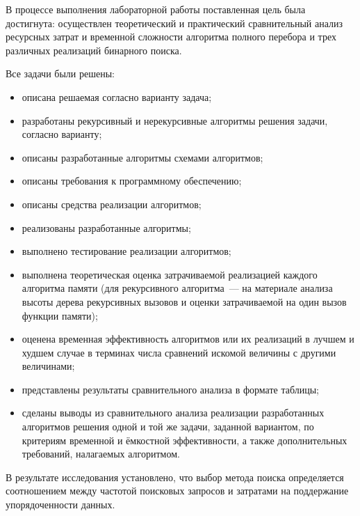 
В процессе выполнения лабораторной работы поставленная цель была достигнута: осуществлен теоретический и практический сравнительный анализ ресурсных затрат и временной сложности алгоритма полного перебора и трех различных реализаций бинарного поиска.

Все задачи были решены:
\begin{itemize}
	\item описана решаемая согласно варианту задача;
	\item разработаны рекурсивный и нерекурсивные алгоритмы решения задачи, согласно варианту;
	\item описаны разработанные алгоритмы схемами алгоритмов;
	\item описаны требования к программному обеспечению;
	\item описаны средства реализации алгоритмов;
	\item реализованы разработанные алгоритмы;
	\item выполнено тестирование реализации алгоритмов;
	\item выполнена теоретическая оценка затрачиваемой реализацией каждого алгоритма памяти (для рекурсивного алгоритма~--- на материале анализа высоты дерева рекурсивных вызовов и оценки затрачиваемой на один вызов функции памяти);
	\item оценена временная эффективность алгоритмов или их реализаций в лучшем и худшем случае в терминах числа сравнений искомой величины с другими величинами;
	\item представлены результаты сравнительного анализа в формате таблицы;
	\item сделаны выводы из сравнительного анализа реализации разработанных алгоритмов решения одной и той же задачи, заданной вариантом, по критериям временной и ёмкостной эффективности, а также дополнительных требований, налагаемых алгоритмом.
\end{itemize}

В результате исследования установлено, что выбор метода поиска определяется соотношением между частотой поисковых запросов и затратами на поддержание упорядоченности данных.